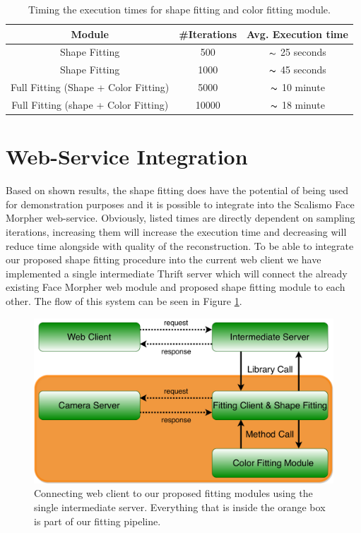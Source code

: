 \begin{table}[h]
  \centering
  \begin{tabular}{ c|c|c }
      Module  & \#Iterations & Avg. Execution time \\
      \hline
      Shape Fitting   & 500  & $\thicksim$ 25 seconds\\
      Shape Fitting   & 1000 & $\thicksim$ 45 seconds\\\hline
      Full Fitting (Shape + Color Fitting)   & 5000 & $\thicksim$ 10 minute \\
      Full Fitting (shape + Color Fitting)   & 10000 & $\thicksim$ 18 minute \\
      \hline
  \end{tabular}
  \caption{Timing the execution times for shape fitting and color fitting module.}
  \label{t4.4}
\end{table}

\section*{Web-Service Integration}

Based on shown results, the shape fitting does have the potential of being used for demonstration purposes and it is possible to integrate into the Scalismo Face Morpher web-service. Obviously, listed times are directly dependent on sampling iterations, increasing them will increase the execution time and decreasing will reduce time alongside with quality of the reconstruction. To be able to integrate our proposed shape fitting procedure into the current web client we have implemented a single intermediate Thrift server which will connect the already existing Face Morpher web module and proposed shape fitting module to each other. The flow of this system can be seen in Figure \ref{f4.7}.

\begin{figure}
  \centering
  \includegraphics[width=\textwidth]{Figures/web-fitting.pdf}
  \caption{Connecting web client to our proposed fitting modules using the single intermediate server. Everything that is inside the orange box is part of our fitting pipeline.}
  \label{f4.7}
\end{figure}

